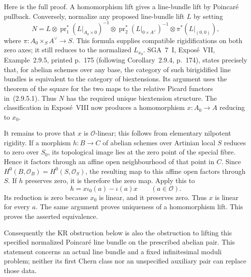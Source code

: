Here is the full proof.  A homomorphism lift gives a
line-bundle lift by Poincar\'e pullback.  Conversely,
normalize any proposed line-bundle lift $L$ by setting
\[
 N=L\otimes\operatorname{pr}_1^*(L|_{A_0\times0})^{-1}
       \otimes\operatorname{pr}_2^*(L|_{0\times A^\vee})^{-1}
       \otimes\pi^*(L|_{(0,0)}),
\]
where $\pi:A_0\times_S A^\vee\to S$.
This formula supplies compatible rigidifications on
both zero axes; it still reduces to the normalized
$L_{x_0}$.  SGA~7~I, Expos\'e~VII, Example~2.9.5,
printed p.~175 (following Corollary~2.9.4, p.~174),
states precisely that, for abelian schemes over any
base, the category of such birigidified line bundles
is equivalent to the category of biextensions.
Its argument uses the theorem of the square for the
two maps to the relative Picard functors in~(2.9.5.1).
Thus $N$ has the required unique biextension structure.
The classification in Expos\'e~VIII now produces a
homomorphism $x:A_0\to A$ reducing to $x_0$.

It remains to prove that $x$ is $\mathcal O$-linear;
this follows from elementary nilpotent rigidity.
If a morphism $h:B\to C$ of abelian schemes over
Artinian local $S$ reduces to zero over $S_0$,
its topological image lies at the zero point of the
special fibre.  Hence it factors through an affine
open neighbourhood of that point in $C$.
Since $H^0(B,\mathcal O_B)=H^0(S,\mathcal O_S)$,
the resulting map to this affine open factors through
$S$.  If $h$ preserves zero, it is therefore the zero
map.  Apply this to
\[
                h=x\iota_0(a)-\iota(a)x
                              \qquad(a\in\mathcal O).
\]
Its reduction is zero because $x_0$ is linear, and it
preserves zero.  Thus $x$ is linear for every $a$.
The same argument proves uniqueness of a homomorphism
lift.  This proves the asserted equivalence.

Consequently the KR obstruction below is also the
obstruction to lifting this specified normalized
Poincar\'e line bundle on the prescribed abelian
pair.  This statement concerns an actual line bundle
and a fixed infinitesimal moduli problem; neither its
first Chern class nor an unspecified auxiliary pair
can replace those data.

